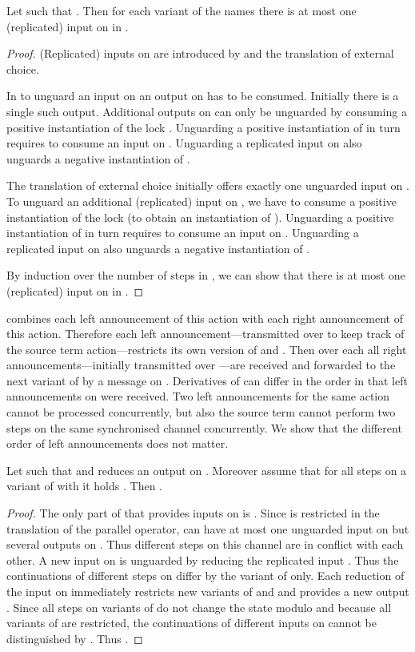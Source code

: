\documentclass[]{eptcs}
\begin{document}
\begin{lemma}
	Let  such that . Then for each variant  of the names  there is at most one (replicated) input on  in .
	\label{lem:reqLocks}
\end{lemma}

\begin{proof}
	(Replicated) inputs on  are introduced by  and the translation of external choice.
	
	In  to unguard an input on  an output on  has to be consumed. Initially there is a single such output. Additional outputs on  can only be unguarded by consuming a positive instantiation of the lock . Unguarding a positive instantiation of  in turn requires to consume an input on . Unguarding a replicated input on  also unguards a negative instantiation of .
	
	The translation of external choice initially offers exactly one unguarded input on . To unguard an additional (replicated) input on , we have to consume a positive instantiation of the lock  (to obtain an instantiation of ). Unguarding a positive instantiation of  in turn requires to consume an input on . Unguarding a replicated input on  also unguards a negative instantiation of .
	
	By induction over the number of steps in , we can show that there is at most one (replicated) input on  in .
\end{proof}

 combines each left announcement of this action with each right announcement of this action. Therefore each left announcement---transmitted over  to keep track of the source term action---restricts its own version of  and . Then over each  all right announcements---initially transmitted over ---are received and forwarded to the next variant of  by a message on . Derivatives of  can differ in the order in that left announcements on  were received. Two left announcements for the same action cannot be processed concurrently, but also the source term cannot perform two steps on the same synchronised channel concurrently. We show that the different order of left announcements does not matter.

\begin{lemma}
	Let  such that  and  reduces an output on . Moreover assume that for all steps  on a variant of  with  it holds .
	Then .
	\label{lem:orderLeftAnn}
\end{lemma}

\begin{proof}
	The only part of  that provides inputs on  is . Since  is restricted in the translation of the parallel operator,  can have at most one unguarded input on  but several outputs on . Thus different steps on this channel are in conflict with each other.
	A new input on  is unguarded by reducing the replicated input . Thus the continuations of different steps on  differ by the variant of  only. Each reduction of the input on  immediately restricts new variants of  and  and provides a new output . Since all steps on variants of  do not change the state modulo  and because all variants of  are restricted, the continuations of different inputs on   cannot be distinguished by .
	Thus .
\end{proof}
\end{document}
